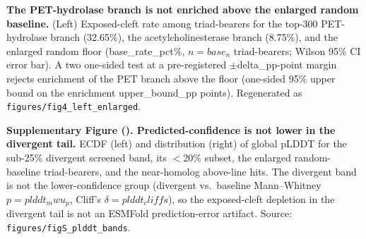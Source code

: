 \textbf{The PET-hydrolase branch is not enriched above the enlarged random baseline.}
(Left) Exposed-cleft rate among triad-bearers for the top-300 PET-hydrolase branch
(32.65\%), the acetylcholinesterase branch (8.75\%), and the enlarged random floor
({{base_rate_pct}}\%, $n={{base_n}}$ triad-bearers; Wilson 95\% CI error bar). A two
one-sided test at a pre-registered $\pm${{delta_pp}}-point margin rejects enrichment of
the PET branch above the floor (one-sided 95\% upper bound on the enrichment
{{upper_bound_pp}} points). Regenerated as \texttt{figures/fig4\_left\_enlarged}.

\textbf{Supplementary Figure (\label{figS_plddt}). Predicted-confidence is not lower in
the divergent tail.} ECDF (left) and distribution (right) of global pLDDT for the
sub-25\% divergent screened band, its $<$20\% subset, the enlarged random-baseline
triad-bearers, and the near-homolog above-line hits. The divergent band is not the
lower-confidence group (divergent vs.\ baseline Mann--Whitney $p={{plddt_mwu_p}}$,
Cliff's $\delta={{plddt_cliffs}}$), so the exposed-cleft depletion in the divergent
tail is not an ESMFold prediction-error artifact. Source:
\texttt{figures/figS\_plddt\_bands}.
